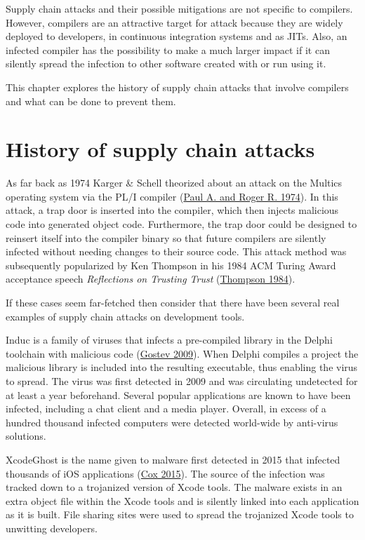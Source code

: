 \documentclass[
  a4paper,
]{report}
\begin{document}
Supply chain attacks and their possible mitigations are not specific to
compilers. However, compilers are an attractive target for attack
because they are widely deployed to developers, in continuous
integration systems and as JITs. Also, an infected compiler has the
possibility to make a much larger impact if it can silently spread the
infection to other software created with or run using it.

This chapter explores the history of supply chain attacks that involve
compilers and what can be done to prevent them.

\hypertarget{history-of-supply-chain-attacks}{%
\section{History of supply chain
attacks}\label{history-of-supply-chain-attacks}}

As far back as 1974 Karger \& Schell theorized about an attack on the
Multics operating system via the PL/I compiler
(\protect\hyperlink{ref-Karger1974}{Paul A. and Roger R. 1974}). In this
attack, a trap door is inserted into the compiler, which then injects
malicious code into generated object code. Furthermore, the trap door
could be designed to reinsert itself into the compiler binary so that
future compilers are silently infected without needing changes to their
source code. This attack method was subsequently popularized by Ken
Thompson in his 1984 ACM Turing Award acceptance speech
\emph{Reflections on Trusting Trust}
(\protect\hyperlink{ref-Thompson1984}{Thompson 1984}).

If these cases seem far-fetched then consider that there have been
several real examples of supply chain attacks on development tools.

Induc is a family of viruses that infects a pre-compiled library in the
Delphi toolchain with malicious code
(\protect\hyperlink{ref-Gostev2009}{Gostev 2009}). When Delphi compiles
a project the malicious library is included into the resulting
executable, thus enabling the virus to spread. The virus was first
detected in 2009 and was circulating undetected for at least a year
beforehand. Several popular applications are known to have been
infected, including a chat client and a media player. Overall, in excess
of a hundred thousand infected computers were detected world-wide by
anti-virus solutions.

XcodeGhost is the name given to malware first detected in 2015 that
infected thousands of iOS applications
(\protect\hyperlink{ref-Cox2015}{Cox 2015}). The source of the infection
was tracked down to a trojanized version of Xcode tools. The malware
exists in an extra object file within the Xcode tools and is silently
linked into each application as it is built. File sharing sites were
used to spread the trojanized Xcode tools to unwitting developers.
\end{document}
